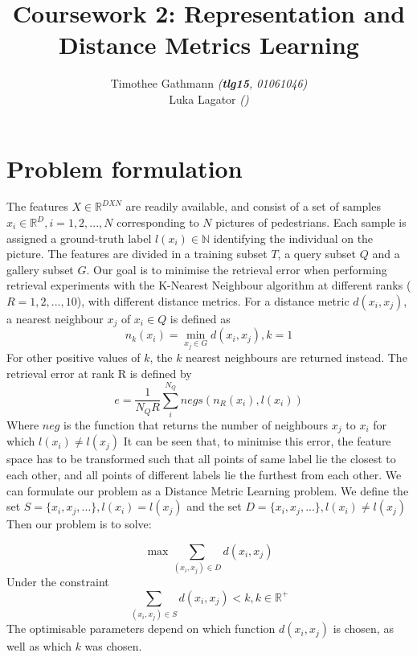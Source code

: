 \documentclass[10pt,technote]{IEEEtran}
\title{Coursework 2: Representation and Distance Metrics Learning }
\author{Timothee Gathmann \textit{(\textbf{tlg15}, 01061046)}\\ Luka Lagator\textit{ ()}}
\begin{document}
\maketitle

\section{Problem formulation}
The features $X \in \mathbb{R}^{D X N}$ are readily available, and consist of a set of samples $x_i \in \mathbb{R}^D, i = 1, 2, ..., N$ corresponding to $N$ pictures of pedestrians. Each sample is assigned a ground-truth label $l(x_i) \in \mathbb{N}$ identifying the individual on the picture. The features are divided in a training subset $T$, a query subset $Q$ and a gallery subset $G$. Our goal is to minimise the retrieval error when performing retrieval experiments with the K-Nearest Neighbour algorithm \cite{Cover1967} at different ranks ($R = 1, 2, ..., 10 $), with different distance metrics. For a distance metric $d(x_i, x_j)$, a nearest neighbour $x_j$ of $x_i \in Q$ is defined as
\begin{equation}
n_k(x_i) = \min_{x_j \in G}  d(x_i, x_j), k = 1
\end{equation}
For other positive values of $k$, the $k$ nearest neighbours are returned instead.
The retrieval error at rank R is defined by
\begin{equation}
e = \frac{1}{N_Q R}\sum^{N_Q}_{i} negs(n_R(x_i), l(x_i)) 
\end{equation}
Where $neg$ is the function that returns the number of neighbours $x_j$ to $x_i$ for which $l(x_i) \neq l(x_j)$
It can be seen that, to minimise this error, the feature space has to be transformed such that all points of same label lie the closest to each other, and all points of different labels lie the furthest from each other.
We can formulate our problem as a Distance Metric Learning problem. We define the set $S = \lbrace x_i, x_j, ...\rbrace, l(x_i) = l(x_j)$ and the set $D = \lbrace x_i, x_j, ...\rbrace, l(x_i) \neq l(x_j)$
Then our problem is to solve:

\begin{equation}
\max \sum_{(x_i, x_j) \in D} d(x_i, x_j)
\end{equation}
Under the constraint
\begin{equation}
\sum_{(x_i, x_j) \in S} d(x_i, x_j) < k, k \in \mathbb{R^+}
\end{equation}
The optimisable parameters depend on which function $d(x_i, x_j)$ is chosen, as well as which $k$ was chosen.







\end{document}
